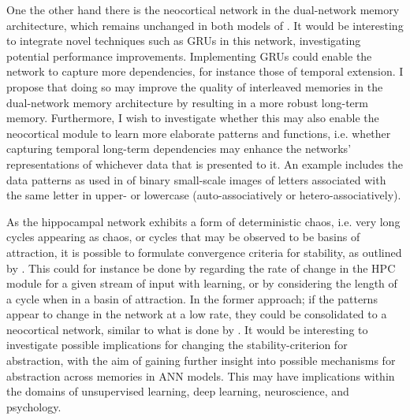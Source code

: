 One the other hand there is the neocortical network in the dual-network memory architecture, which remains unchanged in both models of \cite{Hattori2010, Hattori2014}. It would be interesting to integrate novel techniques such as GRUs in this network, investigating potential performance improvements. Implementing GRUs could enable the network to capture more dependencies, for instance those of temporal extension.
I propose that doing so may improve the quality of interleaved memories in the dual-network memory architecture by resulting in a more robust long-term memory. Furthermore, I wish to investigate whether this may also enable the neocortical module to learn more elaborate patterns and functions, i.e. whether capturing temporal long-term dependencies may enhance the networks' representations of whichever data that is presented to it. An example includes the data patterns as used in \citep{Hattori2014} of binary small-scale images of letters associated with the same letter in upper- or lowercase (auto-associatively or hetero-associatively).

As the hippocampal network exhibits a form of deterministic chaos, i.e. very long cycles appearing as chaos, or cycles that may be observed to be basins of attraction, it is possible to formulate convergence criteria for stability, as outlined by \cite{Hattori2014}. This could for instance be done by regarding the rate of change in the HPC module for a given stream of input with learning, or by considering the length of a cycle when in a basin of attraction. In the former approach; if the patterns appear to change in the network at a low rate, they could be consolidated to a neocortical network, similar to what is done by \cite{Hattori2014}.
It would be interesting to investigate possible implications for changing the stability-criterion for abstraction, with the aim of gaining further insight into possible mechanisms for abstraction across memories in ANN models. This may have implications within the domains of unsupervised learning, deep learning, neuroscience, and psychology.

